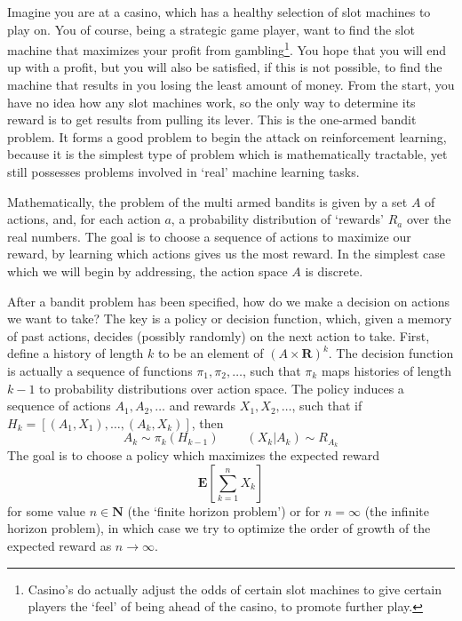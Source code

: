 Imagine you are at a casino, which has a healthy selection of slot machines to play on. You of course, being a strategic game player, want to find the slot machine that maximizes your profit from gambling\footnote{Casino's do actually adjust the odds of certain slot machines to give certain players the `feel' of being ahead of the casino, to promote further play.}. You hope that you will end up with a profit, but you will also be satisfied, if this is not possible, to find the machine that results in you losing the least amount of money. From the start, you have no idea how any slot machines work, so the only way to determine its reward is to get results from pulling its lever. This is the one-armed bandit problem. It forms a good problem to begin the attack on reinforcement learning, because it is the simplest type of problem which is mathematically tractable, yet still possesses problems involved in `real' machine learning tasks.

Mathematically, the problem of the multi armed bandits is given by a set $A$ of actions, and, for each action $a$, a probability distribution of `rewards' $R_a$ over the real numbers. The goal is to choose a sequence of actions to maximize our reward, by learning which actions gives us the most reward. In the simplest case which we will begin by addressing, the action space $A$ is discrete.

After a bandit problem has been specified, how do we make a decision on actions we want to take? The key is a policy or decision function, which, given a memory of past actions, decides (possibly randomly) on the next action to take. First, define a history of length $k$ to be an element of $(A \times \mathbf{R})^k$. The decision function is actually a sequence of functions $\pi_1, \pi_2, \dots$, such that $\pi_k$ maps histories of length $k-1$ to probability distributions over action space. The policy induces a sequence of actions $A_1, A_2, \dots$ and rewards $X_1, X_2, \dots$, such that if $H_k = [(A_1,X_1), \dots, (A_k, X_k)]$, then
%
\[ A_k \sim \pi_k(H_{k-1})\ \ \ \ \ \ \ \ \ \ (X_k | A_k) \sim R_{A_k} \]
%
The goal is to choose a policy which maximizes the expected reward
%
\[ \mathbf{E} \left[\sum_{k=1}^n X_k \right] \]
%
for some value $n \in \mathbf{N}$ (the `finite horizon problem') or for $n = \infty$ (the infinite horizon problem), in which case we try to optimize the order of growth of the expected reward as $n \to \infty$.

